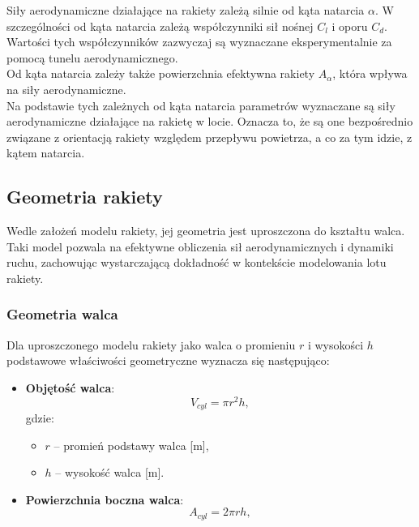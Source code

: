 Siły aerodynamiczne działające na rakiety zależą silnie od kąta natarcia $\alpha$. W szczególności od kąta natarcia zależą współczynniki sił nośnej $C_l$ i oporu $C_d$. Wartości tych współczynników zazwyczaj są wyznaczane eksperymentalnie za pomocą tunelu aerodynamicznego. \\
Od kąta natarcia zależy także powierzchnia efektywna rakiety $A_\alpha$,
która wpływa na siły aerodynamiczne. \\
Na podstawie tych zależnych od kąta natarcia parametrów wyznaczane są siły
aerodynamiczne działające na rakietę w locie. Oznacza to, że są one
bezpośrednio związane z orientacją rakiety względem przepływu powietrza, a
co za tym idzie, z kątem natarcia.


\subsection{Geometria rakiety}

Wedle założeń modelu rakiety, jej geometria jest uproszczona do kształtu
walca. Taki model pozwala na efektywne obliczenia sił aerodynamicznych i dynamiki ruchu, zachowując wystarczającą dokładność w kontekście modelowania lotu rakiety.

\subsubsection{Geometria walca}

Dla uproszczonego modelu rakiety jako walca o promieniu $r$ i wysokości $h$
podstawowe właściwości geometryczne wyznacza się następująco:

\begin{itemize}
    \item \textbf{Objętość walca}:
    \begin{equation}
        V_{cyl} = \pi r^2 h,
        \label{eq:cylinder_volume}
    \end{equation}
    gdzie:
    \begin{itemize}
        \item $r$ -- promień podstawy walca [m],
        \item $h$ -- wysokość walca [m].
    \end{itemize}

    \item \textbf{Powierzchnia boczna walca}:
\begin{equation}
    A_{cyl} = 2\pi r h,
    \label{eq:cylinder_surface}
\end{equation}
\end{itemize}

